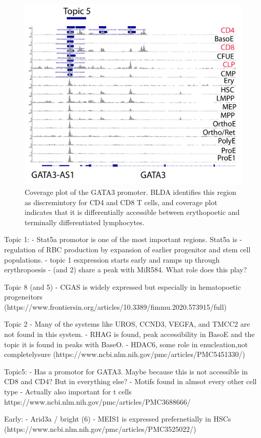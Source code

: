 \begin{figure}
  \centering
  \includegraphics[width=\textwidth]{plot/ch4/GATA3.pdf}
  \caption[GATA3 Promotor]{Coverage plot of the GATA3 promoter. BLDA identifies this region as discremintory for CD4 and CD8 T cells, and coverage plot indicates that it is differentially accessible between erythopoetic and terminally differentiated lymphocytes.}
  \label{fig:gata3}
\end{figure}


Topic 1:
  - Stat5a promotor is one of the most important regions. Stat5a is 
    -  regulation of RBC production by expansion of earlier progenitor and stem cell populations.
    - topic 1 esxpression starts early and ramps up through erythropoesis
    - (and 2) share a peak with MiR584. What role does this play?

  Topic 8 (and 5)
    - CGAS is widely expressed but especially in hematopoetic progeneitors (https://www.frontiersin.org/articles/10.3389/fimmu.2020.573915/full)

Topic 2
  - Many of the systems like UROS, CCND3, VEGFA, and TMCC2 are not found in this system.
  - RHAG is found, peak accessibility in BasoE and the topic it is found in peaks with BaseO. 
  - HDAC6, some role in enucleation,not completelysure (https://www.ncbi.nlm.nih.gov/pmc/articles/PMC5451330/)

Topic5:
  - Has a promotor for GATA3. Maybe because this is not accessible in CD8 and CD4? But in everything else? 
    - Motifs found in almsot every other cell type
  - Actually also important for t cells https://www.ncbi.nlm.nih.gov/pmc/articles/PMC3688666/

Early: 
  - Arid3a / bright (6)
  - MEIS1 is expressed prefernetially in HSCs (https://www.ncbi.nlm.nih.gov/pmc/articles/PMC3525022/)
